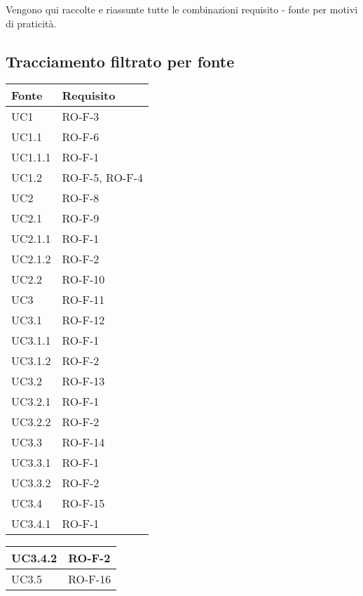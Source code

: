 Vengono qui raccolte e riassunte tutte le combinazioni requisito - fonte per motivi di praticità.
\subsection{Tracciamento filtrato per fonte}
\begin{center}
\renewcommand{\arraystretch}{1.8} %
\begin{tabular}{ |m{8em}|m{13em}| }
    \hline
    \textbf{Fonte} & \textbf{Requisito} \\
    \hline
    UC1         &   RO-F-3 \\
    \hline
    UC1.1       &   RO-F-6 \\
    \hline
    UC1.1.1     &   RO-F-1 \\
    \hline
    UC1.2       &   RO-F-5, RO-F-4 \\
    \hline
    UC2         &   RO-F-8 \\
    \hline
    UC2.1       &   RO-F-9 \\
    \hline
    UC2.1.1     &   RO-F-1 \\
    \hline
    UC2.1.2     &   RO-F-2 \\
    \hline
    UC2.2       &   RO-F-10 \\
    \hline
    UC3         &   RO-F-11 \\
    \hline
    UC3.1       &   RO-F-12 \\
    \hline
    UC3.1.1     &   RO-F-1 \\
    \hline
    UC3.1.2     &   RO-F-2 \\
    \hline
    UC3.2       &   RO-F-13 \\
    \hline
    UC3.2.1     &   RO-F-1 \\
    \hline
    UC3.2.2     &   RO-F-2 \\
    \hline
    UC3.3       &   RO-F-14 \\
    \hline
    UC3.3.1     &   RO-F-1 \\
    \hline
    UC3.3.2     &   RO-F-2 \\
    \hline
    UC3.4       &   RO-F-15 \\
    \hline
    UC3.4.1     &   RO-F-1 \\
    \hline
    \end{tabular}
    \newpage
    \begin{tabular}{ |m{8em}|m{13em}| }
    \hline
    UC3.4.2     &   RO-F-2 \\
    \hline
    UC3.5       &   RO-F-16 \\

\end{tabular}
\end{center}

